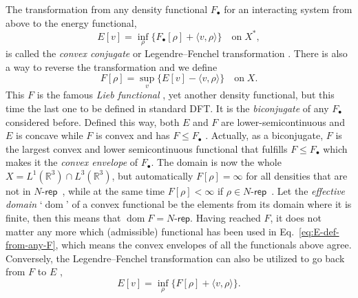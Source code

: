 \documentclass[journal=apcach,manuscript=article,layout=twocolumn]{achemso}
\newcommand{\R}{\mathbb{R}}
\newcommand{\Nrep}{\ensuremath{N\text{-}\mathsf{rep}}}
\DeclareMathOperator{\dom}{dom}
\begin{document}
The transformation from any density functional $F_\bullet$ for an interacting system from above to the energy functional,
\begin{equation}\label{eq:E-def-from-any-F}
E[v] = \inf_\rho \{F_\bullet[\rho]+\langle v,\rho \rangle\} \quad\text{on}\; X^*,
\end{equation}
is called the \emph{convex conjugate} or Legendre--Fenchel transformation \cite[Section~2.1.4]{Barbu-Precupanu}.
There is also a way to reverse the transformation and we define
\begin{equation}\label{eq:F-def}
F[\rho] = \sup_v \{E[v]-\langle v,\rho \rangle\}\quad\text{on}\; X.
\end{equation}
This $F$ is the famous \emph{Lieb functional} \cite{Lieb1983}, yet another density functional, but this time the last one to be defined in standard DFT. It is the \emph{biconjugate} of any $F_\bullet$ considered before. Defined this way, both $E$ and $F$ are lower-semicontinuous and $E$ is concave while $F$ is convex and has $F\leq F_\bullet$ \cite[Proposition~2.19]{Barbu-Precupanu}. Actually, as a biconjugate, $F$ is the largest convex and lower semicontinuous functional that fulfills $F\leq F_\bullet$ which makes it the \emph{convex envelope} of $F_\bullet$. 
%
The domain is now the whole $X=L^1(\R^3)\cap L^3(\R^3)$, but automatically $F[\rho] = \infty$ for all densities that are not in $\Nrep$~\cite[Theorem~3.8]{Lieb1983}, while at the same time $F[\rho] < \infty$ if $\rho\in\Nrep$~\cite[Theorem~3.9 and the following Remark]{Lieb1983}. Let the \emph{effective domain} `$\dom$' of a convex functional be the elements from its domain where it is finite, then this means that $\dom F = \Nrep$.
Having reached $F$, it does not matter any more which (admissible) functional has been used in Eq.~\eqref{eq:E-def-from-any-F}, which means the convex envelopes of all the functionals above agree. Conversely, the Legendre--Fenchel transformation can also be utilized to go back from $F$ to $E$ \cite[Theorem~2.22]{Barbu-Precupanu},
\begin{equation}\label{eq:E-LF}
E[v] = \inf_\rho \{ F[\rho] + \langle v,\rho \rangle \}.
\end{equation}
\end{document}

